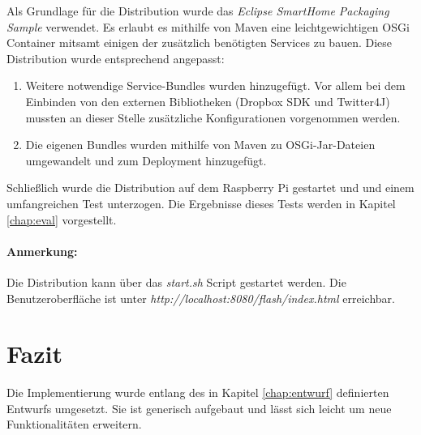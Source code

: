 Als Grundlage für die Distribution wurde das \textit{Eclipse SmartHome Packaging Sample}\cite{eshsample} verwendet. Es erlaubt es mithilfe von Maven\cite{maven} eine leichtgewichtigen OSGi Container mitsamt einigen der zusätzlich benötigten Services zu bauen. Diese Distribution wurde entsprechend angepasst: 
\begin{enumerate}
\item Weitere notwendige Service-Bundles wurden hinzugefügt. Vor allem bei dem Einbinden von den externen Bibliotheken (Dropbox SDK und Twitter4J) mussten an dieser Stelle zusätzliche Konfigurationen vorgenommen werden.
\item Die eigenen Bundles wurden mithilfe von Maven zu OSGi-Jar-Dateien umgewandelt und zum Deployment hinzugefügt.
\end{enumerate}

Schließlich wurde die Distribution auf dem Raspberry Pi gestartet und und einem umfangreichen Test unterzogen. Die Ergebnisse dieses Tests werden in Kapitel \ref{chap:eval} vorgestellt.

\paragraph{Anmerkung:} Die Distribution kann über das \textit{start.sh} Script gestartet werden. Die Benutzeroberfläche ist unter \textit{http://localhost:8080/flash/index.html} erreichbar.

\section{Fazit}
Die Implementierung wurde entlang des in Kapitel \ref{chap:entwurf} definierten Entwurfs umgesetzt. Sie ist generisch aufgebaut und lässt sich leicht um neue Funktionalitäten erweitern.
